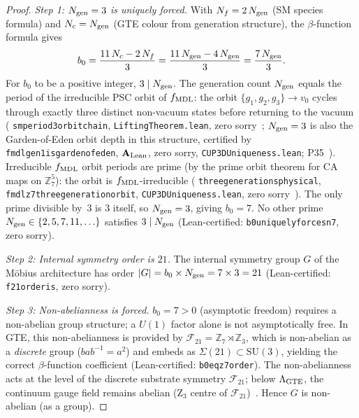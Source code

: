 \documentclass[11pt]{article}
\theoremstyle{remark}
\newcommand{\ZS}{\mathbb{Z}_7}
\newcommand{\ZZ}{\mathbb{Z}}
\newcommand{\lean}[1]{%
  \penalty-100
  \begingroup\def\_{\textunderscore\allowbreak}\texttt{#1}\endgroup}
\newcommand{\fmdl}{f_{\rm MDL}}
\newcommand{\FTT}{\mathcal{F}_{21}}
\newcommand{\CatAL}{\ensuremath{\textbf{A}_{\rm Lean}}}
\begin{document}
\begin{proof}
\textit{Step 1: $N_{\rm gen} = 3$ is uniquely forced.}
With $N_f = 2\,N_{\rm gen}$ (SM species formula) and $N_c = N_{\rm gen}$ (GTE colour from
generation structure), the $\beta$-function formula gives
\[
  b_0 = \frac{11\,N_c - 2\,N_f}{3} = \frac{11\,N_{\rm gen} - 4\,N_{\rm gen}}{3}
       = \frac{7\,N_{\rm gen}}{3}.
\]
For $b_0$ to be a positive integer, $3 \mid N_{\rm gen}$.
The generation count $N_{\rm gen}$ equals the period of the irreducible PSC orbit
of $\fmdl$: the orbit $\{g_1,g_2,g_3\}\to v_0$ cycles through exactly three
distinct non-vacuum states before returning to the vacuum
(\lean{sm\_period3\_orbit\_chain}, \lean{LiftingTheorem.lean},
zero sorry~\cite{SpivackCMCA};
$N_{\rm gen}=3$ is also the Garden-of-Eden orbit depth in this structure,
certified by \lean{fmdl\_gen1\_is\_garden\_of\_eden},
$\CatAL$, zero sorry, \lean{CUP3DUniqueness.lean}; P35~\cite{SpivackGTEUnification}).
Irreducible $\fmdl$ orbit periods are prime (by the prime orbit theorem for CA maps
on $\ZS^5$): the orbit is $\fmdl$-irreducible
(\lean{three\_generations\_physical},
\lean{fmdl\_z7\_three\_generation\_orbit},
\lean{CUP3DUniqueness.lean}, zero sorry~\cite{SpivackCMCA}).
The only prime divisible by~$3$ is $3$ itself, so $N_{\rm gen}=3$, giving $b_0=7$.
No other prime $N_{\rm gen} \in \{2, 5, 7, 11, \ldots\}$ satisfies $3 \mid N_{\rm gen}$
(Lean-certified: \lean{b0\_uniquely\_forces\_n7}, zero sorry).

\textit{Step 2: Internal symmetry order is $21$.}
The internal symmetry group $G$ of the Möbius architecture has order
$|G| = b_0 \times N_{\rm gen} = 7 \times 3 = 21$
(Lean-certified: \lean{f21\_order\_is\_21}, zero sorry).

\textit{Step 3: Non-abelianness is forced.}
$b_0 = 7 > 0$ (asymptotic freedom) requires a non-abelian group structure; a $U(1)$
factor alone is not asymptotically free.  In GTE, this non-abelianness is provided
by $\FTT = \ZS \rtimes \ZZ_3$, which is non-abelian as a \emph{discrete} group
($bab^{-1} = a^2$) and embeds as $\Sigma(21) \subset \mathrm{SU}(3)$, yielding the
correct $\beta$-function coefficient (Lean-certified: \lean{b0\_eq\_z7\_order}).
The non-abelianness acts at the level of the discrete substrate symmetry $\FTT$;
below $\Lambda_{\rm GTE}$, the continuum gauge field remains abelian (Z$_3$ centre
of $\FTT$)~\cite{SpivackGTEUnification}.  Hence $G$ is non-abelian (as a group).


\end{proof}
\end{document}
